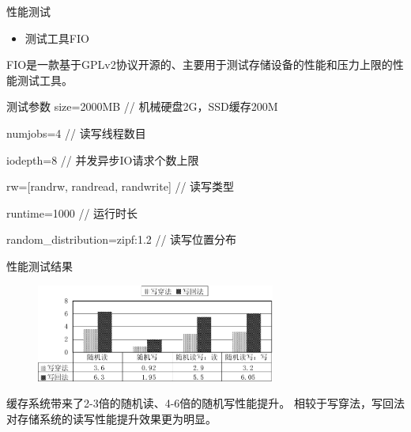 \documentclass[compress]{beamer}
\begin{document}
\begin{frame}{性能测试}
\begin{itemize}
\item 测试工具FIO
\end{itemize}
FIO是一款基于GPLv2协议开源的、主要用于测试存储设备的性能和压力上限的性能测试工具。
\begin{block}{测试参数}
size=2000MB                // 机械硬盘2G，SSD缓存200M

numjobs=4                  // 读写线程数目

iodepth=8                  // 并发异步IO请求个数上限

rw=[randrw, randread, randwrite]  // 读写类型

runtime=1000                      // 运行时长

random\_distribution=zipf:1.2     // 读写位置分布
\end{block}
\end{frame}

\begin{frame}{性能测试结果}
\begin{figure}
\includegraphics[width=0.7\textwidth]{../graph/enhance-rate}
\end{figure}
缓存系统带来了2-3倍的随机读、4-6倍的随机写性能提升。
相较于写穿法，写回法对存储系统的读写性能提升效果更为明显。
\end{frame}
\end{document}
